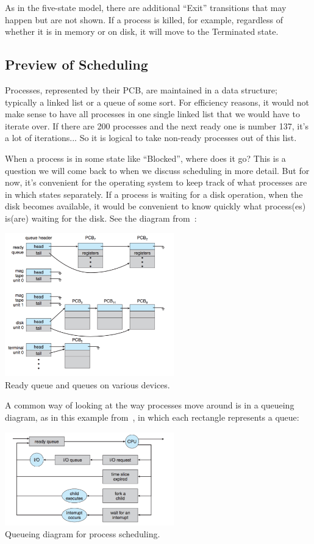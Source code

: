 As in the five-state model, there are additional ``Exit'' transitions that may happen but are not shown. If a process is killed, for example, regardless of whether it is in memory or on disk, it will move to the Terminated state.

\subsection*{Preview of Scheduling}

Processes, represented by their PCB, are maintained in a data structure; typically a linked list or a queue of some sort. For efficiency reasons, it would not make sense to have all processes in one single linked list that we would have to iterate over. If there are 200 processes and the next ready one is number 137, it's a lot of iterations... So it is logical to take non-ready processes out of this list.

When a process is in some state like ``Blocked'', where does it go? This is a question we will come back to when we discuss scheduling in more detail. But for now, it's convenient for the operating system to keep track of what processes are in which states separately. If a process is waiting for a disk operation, when the disk becomes available, it would be convenient to know quickly what process(es) is(are) waiting for the disk. See the diagram from~\cite{osc}:

\begin{center}
\includegraphics[width=0.55\textwidth]{images/pcbs-in-queues.png}\\
Ready queue and queues on various devices.
\end{center}

A common way of looking at the way processes move around is in a queueing diagram, as in this example from~\cite{osc}, in which each rectangle represents a queue:

\begin{center}
\includegraphics[width=0.55\textwidth]{images/queueing-diagram.png}\\
Queueing diagram for process scheduling.
\end{center}

